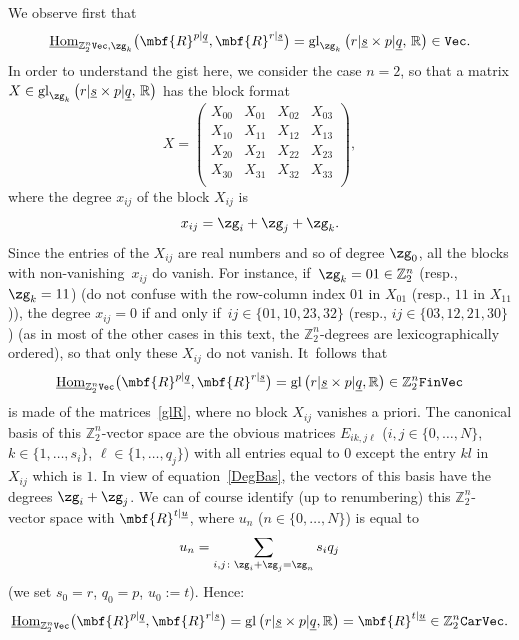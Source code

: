 \documentclass[10pt,a4paper]{amsart}
\newcommand{\op}[1]{\operatorname{#1}}
\DeclareMathOperator{\Hom}{Hom}
\newcommand{\R}{{\mathbb R}}
\newcommand{\Z}{{\mathbb Z}}
\def\ul{\underline}
\def\ul{\underline}
\newcommand{\0}{\otimes}
\newcommand{\z}{\Z_2^n}
\numberwithin{equation}{section}
\begin{document}
We observe first that
\[
\ul{\Hom}_{\z{\tt Vec},\zg_k}\big(\mbf{R}^{p|\ul q},\mbf{R}^{r|\ul s}\big)=\op{gl}_{\zg_k}\big(r|\ul s \times p|\ul q,\,\R\big)\in{\tt Vec}.
\]
In order to understand the gist here, we consider the case $n=2$, so that a matrix $X\in\op{gl}_{\zg_k}\big(r|\ul s \times p|\ul q,\,\R\big)$ has the block format
\begin{equation}\label{glR}
X = \left(\begin{array}{c|c|c|c}
X_{00} & X_{01} & X_{02} & X_{03} \\
\hline
X_{10} & X_{11} & X_{12} & X_{13} \\
\hline
X_{20} & X_{21} & X_{22} & X_{23} \\
\hline
X_{30} & X_{31} & X_{32} & X_{33} \\
\end{array}\right)\!,
\end{equation}
where the degree $x_{ij}$ of the block $X_{ij}$ is
\begin{gather}\label{DegBas}
x_{ij}=\zg_i+\zg_j+\zg_k.
\end{gather}
Since the entries of the $X_{ij}$ are real numbers and so of degree $\zg_0$, all the blocks with non-vani\-shing~$x_{ij}$ do vanish. For instance, if~$\zg_k=01\in\z$ (resp., $\zg_k=11$) (do not confuse with the row-column index $01$ in $X_{01}$ (resp., $11$ in $X_{11}$)), the degree $x_{ij}=0$ if and only if~$ij\in\{01, 10, 23, 32\}$ (resp., $ij\in\{03, 12, 21, 30\}$) (as in most of the other cases in this text, the $\z$-degrees are lexicographically ordered), so that only these $X_{ij}$ do not vanish. It~follows that
\[
\ul{\Hom}_{\z\tt Vec}\big(\mbf{R}^{p|\ul q},\mbf{R}^{r|\ul s}\big)=\op{gl}\big(r|\ul s \times p|\ul q,\R\big)\in\z{\tt FinVec}
\]
is made of the matrices~\eqref{glR}, where no block $X_{ij}$ vanishes a priori. The canonical basis of this $\z$-vector space are the obvious matrices $E_{ik,j\ell}$ ($i,j\in\{0,\dots,N\}$, $k\in\{1,\dots,s_i\}$, $\ell\in\{1,\dots, q_j\}$) with all entries equal to 0 except the entry $kl$ in $X_{ij}$ which is $1$. In view of equation~\eqref{DegBas}, the vectors of this basis have the degrees $\zg_i+\zg_j$. We can of course identify (up to renumbering) this $\z$-vector space with $\mbf{R}^{t|\ul u}$, where $u_n$ ($n\in\{0,\dots,N\}$) is equal to
\begin{gather}\label{UN}
u_n=\sum_{i,j\colon \zg_i+\zg_j=\zg_n}s_iq_j
\end{gather}
(we set $s_0=r$, $q_0=p$, $u_0:=t$). Hence:
\begin{gather}\label{IHomVecMat}
\ul{\Hom}_{\z\tt Vec}\big(\mbf{R}^{p|\ul q},\mbf{R}^{r|\ul s}\big)=\op{gl}\big(r|\ul s \times p|\ul q,\R\big)=\mbf{R}^{t|\ul u}\in\z{\tt CarVec}.
\end{gather}
\end{document}
